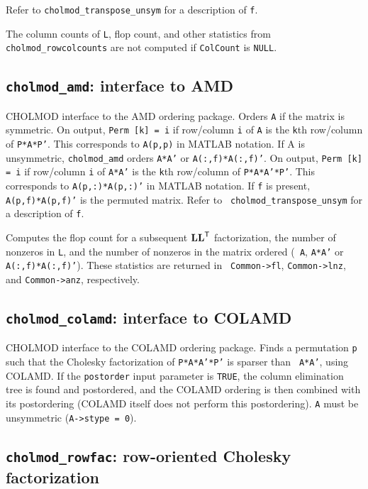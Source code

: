 \documentclass[11pt]{article}
\newcommand{\m}[1]{{\bf{#1}}}       %
\newcommand{\tr}{^{\sf T}}          %
\begin{document}
Refer to {\tt cholmod\_transpose\_unsym} for a description of {\tt f}.

The column counts of {\tt L}, flop count, and other statistics from
{\tt cholmod\_rowcolcounts} are not computed if {\tt ColCount} is {\tt NULL}.

\subsection{{\tt cholmod\_amd}: interface to AMD}


CHOLMOD interface to the AMD ordering package.  Orders {\tt A} if the matrix is
symmetric.  On output, {\tt Perm [k] = i} if row/column {\tt i} of {\tt A} is
the {\tt k}th row/column of {\tt P*A*P'}.  This corresponds to {\tt A(p,p)} in
MATLAB notation.  If A is unsymmetric, {\tt cholmod\_amd} orders {\tt A*A'} or
{\tt A(:,f)*A(:,f)'}.  On output, {\tt Perm [k] = i} if row/column {\tt i} of
{\tt A*A'} is the {\tt k}th row/column of {\tt P*A*A'*P'}.  This corresponds to
{\tt A(p,:)*A(p,:)'} in MATLAB notation.  If {\tt f} is present, {\tt
A(p,f)*A(p,f)'} is the permuted matrix.  Refer to {\tt
cholmod\_transpose\_unsym} for a description of {\tt f}.

Computes the flop count for a subsequent $\m{LL}\tr$ factorization, the number
of nonzeros in {\tt L}, and the number of nonzeros in the matrix ordered ({\tt
A}, {\tt A*A'} or {\tt A(:,f)*A(:,f)'}).  These statistics are returned in {\tt
Common->fl}, {\tt Common->lnz}, and {\tt Common->anz}, respectively.

\subsection{{\tt cholmod\_colamd}: interface to COLAMD}


CHOLMOD interface to the COLAMD ordering package.  Finds a permutation {\tt p}
such that the Cholesky factorization of {\tt P*A*A'*P'} is sparser than {\tt
A*A'}, using COLAMD.  If the {\tt postorder} input parameter is {\tt TRUE}, the
column elimination tree is found and postordered, and the COLAMD ordering is
then combined with its postordering (COLAMD itself does not perform this
postordering).  {\tt A} must be unsymmetric ({\tt A->stype = 0}).

\subsection{{\tt cholmod\_rowfac}: row-oriented Cholesky factorization}
\end{document}
